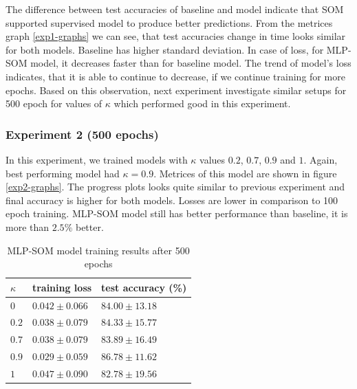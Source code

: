 The difference between test accuracies of baseline and model indicate that SOM supported supervised model to produce better predictions. From the metrices graph \ref{exp1-graphs} we can see, that test accuracies change in time looks similar for both models. Baseline has higher standard deviation. In case of loss, for MLP-SOM model, it decreases faster than for baseline model. The trend of model's loss indicates, that it is able to continue to decrease, if we continue training for more epochs. Based on this observation, next experiment investigate similar setups for 500 epoch for values of $\kappa$ which performed good in this experiment.

\subsubsection{Experiment 2 (500 epochs)}
In this experiment, we trained models with $\kappa$ values $0.2$, $0.7$, $0.9$ and $1$. Again, best performing model had $\kappa = 0.9$. Metrices of this model are shown in figure \ref{exp2-graphs}. The progress plots looks quite similar to previous experiment and final accuracy is higher for both models. Losses are lower in comparison to 100 epoch training. MLP-SOM model still has better performance than baseline, it is more than $2.5\%$ better.

\begin{table}[h!]
\centering
\begin{tabular}{|l|l|l|}
\hline
$\kappa$        & training loss & test accuracy (\%) \\ \hline
\color{purple}$0$   &  \color{purple} $0.042	\pm 0.066 $  &  \color{purple} $84.00	\pm 13.18$  \\ \hline
$0.2$ &   $0.038	\pm 0.079 $  &  $84.33	\pm 15.77$  \\ \hline
$0.7$ &   $0.038	\pm 0.079 $  &  $83.89	\pm 16.49$  \\ \hline
\color{purple} $0.9$ &  \color{purple} $0.029	\pm 0.059 $  & \color{purple} $86.78	\pm 11.62$  \\ \hline
$1$   &   $0.047	\pm 0.090 $  &  $82.78	\pm 19.56$  \\ \hline
\end{tabular}
\caption{MLP-SOM model training results after 500 epochs}
\label{exp2-res-table}
\end{table}


